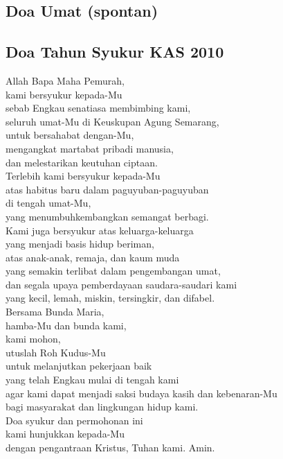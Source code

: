 \documentclass[a5paper,headsepline,titlepage,11pt,nnormalheadings,DIVcalc]{scrbook}
\begin{document}
\subsection*{Doa Umat (spontan)}

\subsection*{Doa Tahun Syukur KAS 2010} 

Allah Bapa Maha Pemurah,\\
kami bersyukur kepada-Mu\\
sebab Engkau senatiasa membimbing kami,\\
seluruh umat-Mu di Keuskupan Agung Semarang,\\
untuk bersahabat dengan-Mu,\\
mengangkat martabat pribadi manusia,\\
dan melestarikan keutuhan ciptaan.\\

Terlebih kami bersyukur kepada-Mu\\
atas habitus baru dalam paguyuban-paguyuban\\
di tengah umat-Mu,\\
yang menumbuhkembangkan semangat berbagi.\\
Kami juga bersyukur atas keluarga-keluarga\\
yang menjadi basis hidup beriman,\\
atas anak-anak, remaja, dan kaum muda\\
yang semakin terlibat dalam pengembangan umat,\\
dan segala upaya pemberdayaan saudara-saudari kami\\
yang kecil, lemah, miskin, tersingkir, dan difabel.\\

Bersama Bunda Maria,\\
hamba-Mu dan bunda kami,\\
kami mohon,\\
utuslah Roh Kudus-Mu\\
untuk melanjutkan pekerjaan baik\\
yang telah Engkau mulai di tengah kami\\
agar kami dapat menjadi saksi budaya kasih dan kebenaran-Mu\\
bagi masyarakat dan lingkungan hidup kami.\\

Doa syukur dan permohonan ini\\
kami hunjukkan kepada-Mu\\
dengan pengantraan Kristus, Tuhan kami. Amin.
\end{document}
